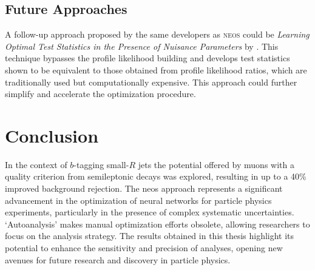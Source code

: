 \subsection{Future Approaches}

A follow-up approach proposed by the same developers as \textsc{neos} could be \textit{Learning Optimal Test Statistics in the Presence of Nuisance Parameters} by \citet{heinrich2022learningoptimalteststatistics}. This technique bypasses the profile likelihood building and develops test statistics shown to be equivalent to those obtained from profile likelihood ratios, which are traditionally used but computationally expensive. This approach could further simplify and accelerate the optimization procedure.




\section{Conclusion}
In the context of $b$-tagging small-$R$ jets the potential offered by muons with a quality criterion from semileptonic decays was explored, resulting in up to a 40\% improved background rejection. The \ac{neos} approach represents a significant advancement in the optimization of neural networks for particle physics experiments, particularly in the presence of complex systematic uncertainties. `Autoanalysis' makes manual optimization efforts obsolete, allowing researchers to focus on the analysis strategy. The results obtained in this thesis highlight its potential to enhance the sensitivity and precision of analyses, opening new avenues for future research and discovery in particle physics.






